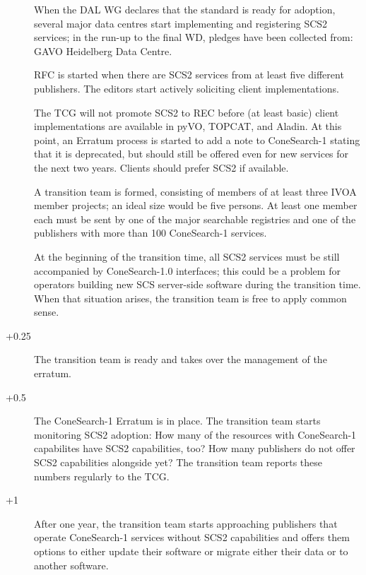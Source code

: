 \documentclass[11pt,a4paper]{ivoa}
\begin{document}
\begin{description}
\item[] When the DAL WG declares that the standard is ready
for adoption, several major data centres start implementing and
registering SCS2 services; in the run-up to the final WD, pledges have
been collected from: GAVO Heidelberg Data
Centre.

\item[] RFC is started when there are SCS2 services from at
least five different publishers.  The editors start actively soliciting
client implementations.

\item[] The TCG will not promote SCS2 to REC before (at least
basic) client implementations are available in pyVO, TOPCAT, and Aladin.
At this point, an Erratum process is started to add a note to
ConeSearch-1 stating that it is deprecated, but should still be offered
even for new services for the next two years.  Clients should prefer
SCS2 if available.

A transition team is formed, consisting of members of at least three
IVOA member projects; an ideal size would be five persons.  At least one
member each must be sent by one of the major searchable registries and
one of the publishers with more than 100 ConeSearch-1 services.

At the beginning of the transition time, all SCS2 services must be still
accompanied by ConeSearch-1.0 interfaces; this could be a problem for
operators building new SCS server-side software during the transition time.
When that situation arises, the transition team is free to apply common
sense.

\item[+0.25] The transition team is ready and takes over the
management of the erratum.

\item[+0.5] The ConeSearch-1 Erratum is in place.  The
transition team starts monitoring SCS2 adoption: How many of the
resources with ConeSearch-1 capabilites have SCS2 capabilities, too?
How many publishers do not offer SCS2 capabilities alongside yet?  The
transition team reports these numbers regularly to the TCG.

\item[+1]  After one year, the transition team starts
approaching publishers that operate ConeSearch-1 services without SCS2
capabilities and offers them options to either update their software or
migrate either their data or to another software.


\end{description}
\end{document}
